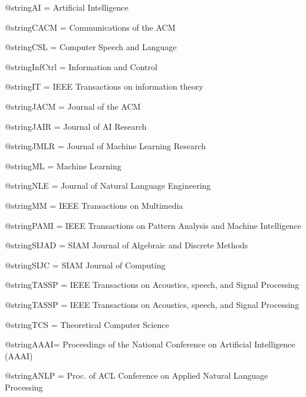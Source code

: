 





@string{AI = {Artificial Intelligence}}

@string{CACM = {Communications of the ACM}}

@string{CSL = {Computer Speech and Language}}


@string{InfCtrl = {Information and Control}}

@string{IT = {IEEE Transactions on information theory}}

@string{JACM = {Journal of the ACM}}

@string{JAIR = {Journal of AI Research}}

@string{JMLR = {Journal of Machine Learning Research}}

@string{ML = {Machine Learning}}

@string{NLE = {Journal of Natural Language Engineering}}

@string{MM = {IEEE Transactions on Multimedia}}

@string{PAMI = {IEEE Transactions on Pattern Analysis and Machine Intelligence}}

@string{SIJAD = {SIAM Journal of Algebraic and Discrete Methods}}

@string{SIJC = {SIAM Journal of Computing}}

@string{TASSP = {IEEE Transactions on Acoustics, speech, and Signal Processing}}

@string{TASSP = {IEEE Transactions on Acoustics, speech, and Signal Processing}}

@string{TCS = {Theoretical Computer Science}}






@string{AAAI= {Proceedings of the National Conference on Artificial Intelligence (AAAI)}}

@string{ANLP = {Proc. of ACL Conference on Applied Natural Language Processing}}

